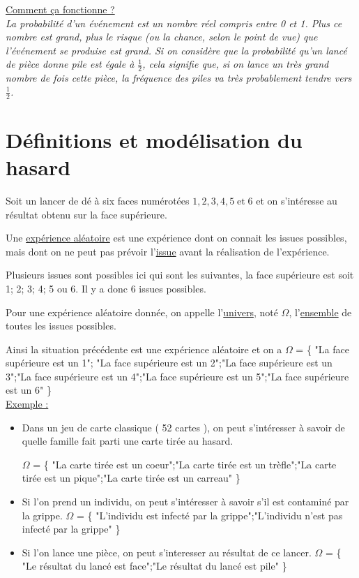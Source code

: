 \documentclass[french]{book}
\begin{document}
\underline{Comment ça fonctionne ? }\\

\textit{La probabilité d'un événement est un nombre réel compris entre 0 et 1. Plus ce nombre est grand, plus le risque (ou la chance, selon le point de vue) que l'événement se produise est grand. Si on considère que la probabilité qu'un lancé de pièce donne pile est égale à $\frac{1}{2}$, cela signifie que, si on lance un très grand nombre de fois cette pièce, la fréquence des piles va très probablement tendre vers $\frac{1}{2}$.} 

\section{Définitions et modélisation du hasard}

Soit un lancer de dé à six faces numérotées $1,2,3,4,5 \; \textrm{et} \; 6$ et on s'intéresse au résultat obtenu sur la face supérieure.


\begin{defn}
Une \underline{expérience aléatoire} est une expérience dont on connait les issues possibles, mais dont on ne peut pas prévoir l'\underline{issue} avant la réalisation de l'expérience.
\end{defn}

Plusieurs issues sont possibles ici qui sont les suivantes, la face supérieure est soit
 1; 2; 3; 4; 5 ou 6. Il y a donc 6 issues possibles.

\begin{defn}
Pour une expérience aléatoire donnée, on appelle l'\underline{univers}, noté $\Omega$, l'\underline{ensemble} de toutes les issues possibles.
 \vspace{4mm}
\end{defn}

Ainsi la situation précédente est une expérience aléatoire et on a $\Omega$ = \{ "La face supérieure est un 1"; "La face supérieure est un 2";"La face supérieure est un 3";"La face supérieure est un 4";"La face supérieure est un 5";"La face supérieure est un 6" \}\\



\underline{Exemple :}
\begin{itemize}
\item Dans un jeu de carte classique ( 52 cartes ), on peut s'intéresser à savoir de quelle famille fait parti une carte tirée au hasard. 

$\Omega$ = \{ "La carte tirée est un coeur";"La carte tirée est un trèfle";"La carte tirée est un pique";"La carte tirée est un carreau"  \}\\
\item Si l'on prend un individu, on peut s'intéresser à savoir s'il est contaminé par la grippe. $\Omega$ = \{ "L'individu est infecté par la grippe";"L'individu n'est pas infecté par la grippe" \}\\
\item Si l'on lance une pièce, on peut s'interesser au résultat de ce lancer.
$\Omega$ = \{ "Le résultat du lancé est face";"Le résultat du lancé est pile" \}\\
\end{itemize}
\end{document}
